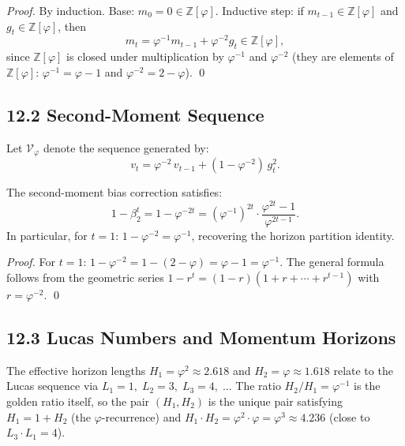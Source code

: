 \begin{proof}
  By induction.  Base: \(m_0 = 0 \in \mathbb{Z}[\varphi]\).
  Inductive step: if \(m_{t-1} \in \mathbb{Z}[\varphi]\) and
  \(g_t \in \mathbb{Z}[\varphi]\), then
  \[
    m_t
    = \varphi^{-1} m_{t-1} + \varphi^{-2} g_t
    \in \mathbb{Z}[\varphi],
  \]
  since \(\mathbb{Z}[\varphi]\) is closed under multiplication by
  \(\varphi^{-1}\) and \(\varphi^{-2}\) (they are elements of
  \(\mathbb{Z}[\varphi]\): \(\varphi^{-1} = \varphi - 1\) and
  \(\varphi^{-2} = 2 - \varphi\)). \qed
\end{proof}

\subsection{12.2 Second-Moment Sequence}

Let \(\mathcal{V}_\varphi\) denote the sequence generated by:
\[
  v_t = \varphi^{-2}\, v_{t-1} + (1-\varphi^{-2})\, g_t^2.
\]

\begin{proposition}
  \label{prop:second-moment-phi}
  The second-moment bias correction satisfies:
  \[
    1 - \beta_2^t = 1 - \varphi^{-2t}
    = (\varphi^{-1})^{2t} \cdot \frac{\varphi^{2t} - 1}{\varphi^{2t-1}}.
  \]
  In particular, for $t = 1$:
  \(1 - \varphi^{-2} = \varphi^{-1}\),
  recovering the horizon partition identity.
\end{proposition}

\begin{proof}
  For $t = 1$: $1 - \varphi^{-2} = 1 - (2-\varphi) = \varphi - 1 = \varphi^{-1}$.
  The general formula follows from the geometric series
  $1 - r^t = (1-r)(1 + r + \cdots + r^{t-1})$ with $r = \varphi^{-2}$.
  \qed
\end{proof}

\subsection{12.3 Lucas Numbers and Momentum Horizons}

The effective horizon lengths \(H_1 = \varphi^2 \approx 2.618\) and
\(H_2 = \varphi \approx 1.618\) relate to the Lucas sequence
via \(L_1 = 1,\; L_2 = 3,\; L_3 = 4,\; \ldots\)
The ratio \(H_2/H_1 = \varphi^{-1}\) is the golden ratio itself,
so the pair \((H_1, H_2)\) is the unique pair satisfying
\(H_1 = 1 + H_2\) (the \(\varphi\)-recurrence) and
\(H_1 \cdot H_2 = \varphi^2 \cdot \varphi = \varphi^3 \approx 4.236\)
(close to \(L_3 \cdot L_1 = 4\)).

